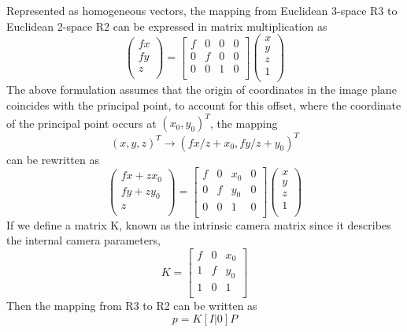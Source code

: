 \begin{enumerate}
Represented as homogeneous vectors, the mapping from Euclidean 3-space R3 to Euclidean 2-space R2 can be expressed in matrix multiplication as
$$
\begin{pmatrix}
  fx \\
  fy \\
  z  \\
\end{pmatrix} =
\begin{bmatrix}
   f & 0 & 0 & 0 \\
   0 & f & 0 & 0 \\
   0 & 0 & 1 & 0 \\
\end{bmatrix}
\begin{pmatrix}
  x \\
  y \\
  z \\
  1 \\
\end{pmatrix}
$$
The above formulation assumes that the origin of coordinates in the image plane coincides with the principal point, to account for this offset, where the coordinate of the principal point occurs at 
$(x_0  , y_0)^T$, the mapping 
$$(x, y, z)^T  \rightarrow  (f x/z + x_0, f y/z + y_0)^T$$
can be rewritten as
$$
\begin{pmatrix}
  fx+zx_0 \\
  fy+zy_0 \\
  z  \\
\end{pmatrix} =
\begin{bmatrix}
   f & 0 & x_0 & 0 \\
   0 & f & y_0 & 0 \\
   0 & 0 & 1 & 0 \\
\end{bmatrix}
\begin{pmatrix}
  x \\
  y \\
  z \\
  1 \\
\end{pmatrix}
$$
If we define a matrix K, known as the intrinsic camera matrix since it describes the internal camera parameters,
$$
K = 
\begin{bmatrix}
   f & 0 & x_0 \\
   1 & f & y_0 \\
   1 & 0 & 1 \\
\end{bmatrix}
$$
Then the mapping from R3 to R2 can be written as
$$p = K[ I|0 ]P$$


\end{enumerate}

